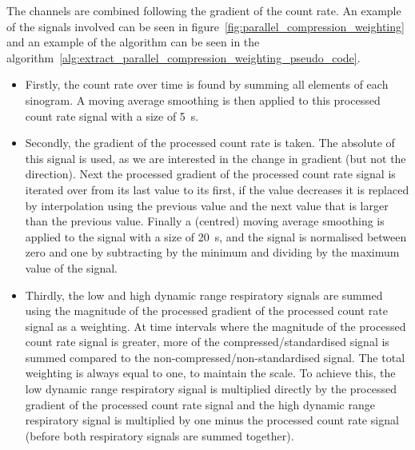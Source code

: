         The channels are combined following the gradient of the count rate. An example of the signals involved can be seen in figure~\ref{fig:parallel_compression_weighting} and an example of the algorithm can be seen in the algorithm~\ref{alg:extract_parallel_compression_weighting_pseudo_code}.

        \begin{itemize}
            \item Firstly, the count rate over time is found by summing all elements of each sinogram. A moving average smoothing is then applied to this processed count rate signal with a size of \SI{5}{\second}.
            
            \item Secondly, the gradient of the processed count rate is taken. The absolute of this signal is used, as we are interested in the change in gradient (but not the direction). Next the processed gradient of the processed count rate signal is iterated over from its last value to its first, if the value decreases it is replaced by interpolation using the previous value and the next value that is larger than the previous value. Finally a (centred) moving average smoothing is applied to the signal with a size of \SI{20}{\second}, and the signal is normalised between zero and one by subtracting by the minimum and dividing by the maximum value of the signal.
            
            \item Thirdly, the low and high dynamic range respiratory signals are summed using the magnitude of the processed gradient of the processed count rate signal as a weighting. At time intervals where the magnitude of the processed count rate signal is greater, more of the compressed/standardised signal is summed compared to the non-compressed/non-standardised signal. The total weighting is always equal to one, to maintain the scale. To achieve this, the low dynamic range respiratory signal is multiplied directly by the processed gradient of the processed count rate signal and the high dynamic range respiratory signal is multiplied by one minus the processed count rate signal (before both respiratory signals are summed together).
        \end{itemize}